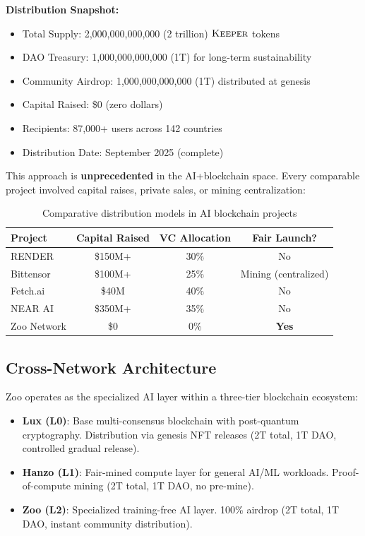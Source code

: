 \textbf{Distribution Snapshot:}
\begin{itemize}
\item Total Supply: 2,000,000,000,000 (2 trillion) $\textsc{Keeper}$ tokens
\item DAO Treasury: 1,000,000,000,000 (1T) for long-term sustainability
\item Community Airdrop: 1,000,000,000,000 (1T) distributed at genesis
\item Capital Raised: \$0 (zero dollars)
\item Recipients: 87,000+ users across 142 countries
\item Distribution Date: September 2025 (complete)
\end{itemize}

This approach is \textbf{unprecedented} in the AI+blockchain space. Every comparable project involved capital raises, private sales, or mining centralization:

\begin{table}[h]
\centering
\begin{tabular}{lccc}
\toprule
\textbf{Project} & \textbf{Capital Raised} & \textbf{VC Allocation} & \textbf{Fair Launch?} \\
\midrule
RENDER & \$150M+ & 30\% & No \\
Bittensor & \$100M+ & 25\% & Mining (centralized) \\
Fetch.ai & \$40M & 40\% & No \\
NEAR AI & \$350M+ & 35\% & No \\
Zoo Network & \$0 & 0\% & \textbf{Yes} \\
\bottomrule
\end{tabular}
\caption{Comparative distribution models in AI blockchain projects}
\label{tab:comparison}
\end{table}

\subsection{Cross-Network Architecture}

Zoo operates as the specialized AI layer within a three-tier blockchain ecosystem:

\begin{itemize}
\item \textbf{Lux (L0)}: Base multi-consensus blockchain with post-quantum cryptography. Distribution via genesis NFT releases (2T total, 1T DAO, controlled gradual release).
\item \textbf{Hanzo (L1)}: Fair-mined compute layer for general AI/ML workloads. Proof-of-compute mining (2T total, 1T DAO, no pre-mine).
\item \textbf{Zoo (L2)}: Specialized training-free AI layer. 100\% airdrop (2T total, 1T DAO, instant community distribution).
\end{itemize}

